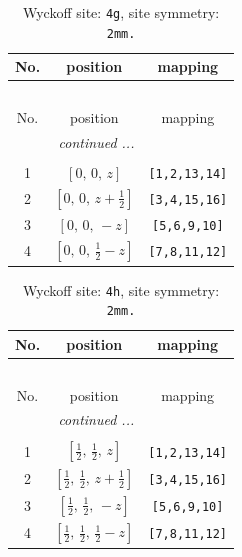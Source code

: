 \documentclass[fleqn,8pt]{jsarticle}
\begin{document}
\begin{longtable}{ccc}
\caption{Wyckoff site: {\tt 4g}, site symmetry: {\tt 2mm.}}
 \\
 \hline \hline
No. & position & mapping \\ \hline \endfirsthead

\multicolumn{2}{l}{\tablename\ \thetable{}} \\
 \hline \hline
No. & position & mapping \\ \hline \endhead

 \hline \hline
\multicolumn{2}{r}{\footnotesize\it continued ...} \\ \endfoot

 \hline \hline
\multicolumn{2}{r}{} \\ \endlastfoot

1 & $\left[ 0,\, 0,\, z \right]$ & {\tt [1,2,13,14]} \\ \hline
2 & $\left[ 0,\, 0,\, z + \frac{1}{2} \right]$ & {\tt [3,4,15,16]} \\ \hline
3 & $\left[ 0,\, 0,\, - z \right]$ & {\tt [5,6,9,10]} \\ \hline
4 & $\left[ 0,\, 0,\, \frac{1}{2} - z \right]$ & {\tt [7,8,11,12]} \\
\end{longtable}
\renewcommand{\arraystretch}{1.2}
\begin{longtable}{ccc}
\caption{Wyckoff site: {\tt 4h}, site symmetry: {\tt 2mm.}}
 \\
 \hline \hline
No. & position & mapping \\ \hline \endfirsthead

\multicolumn{2}{l}{\tablename\ \thetable{}} \\
 \hline \hline
No. & position & mapping \\ \hline \endhead

 \hline \hline
\multicolumn{2}{r}{\footnotesize\it continued ...} \\ \endfoot

 \hline \hline
\multicolumn{2}{r}{} \\ \endlastfoot

1 & $\left[ \frac{1}{2},\, \frac{1}{2},\, z \right]$ & {\tt [1,2,13,14]} \\ \hline
2 & $\left[ \frac{1}{2},\, \frac{1}{2},\, z + \frac{1}{2} \right]$ & {\tt [3,4,15,16]} \\ \hline
3 & $\left[ \frac{1}{2},\, \frac{1}{2},\, - z \right]$ & {\tt [5,6,9,10]} \\ \hline
4 & $\left[ \frac{1}{2},\, \frac{1}{2},\, \frac{1}{2} - z \right]$ & {\tt [7,8,11,12]} \\
\end{longtable}
\end{document}
